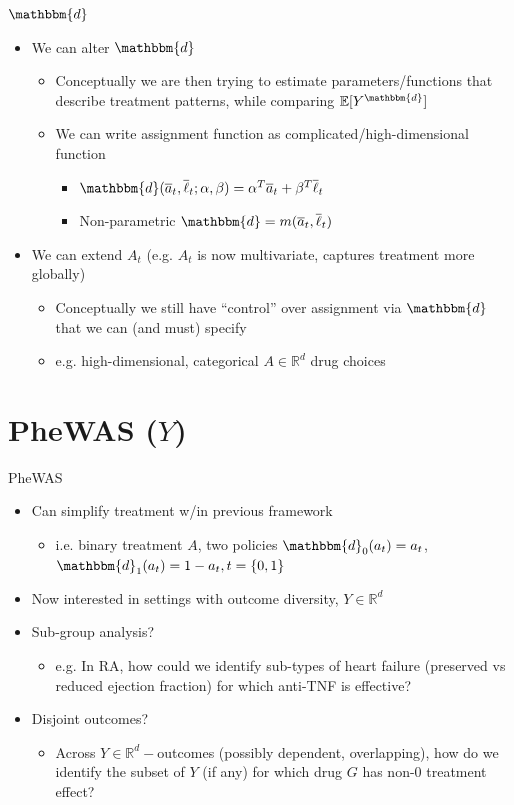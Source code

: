 \documentclass{beamer}
\newcommand{\EE}{\mathbb{E}}
\newcommand{\abar}{\overline{a}}
\newcommand{\lbar}{\overline{\ell}}
\newcommand{\subitem}[1]{\begin{itemize} \item #1 \end{itemize}}
\newcommand{\widesubitem}[2]{\begin{itemize} \item #1 \end{itemize} \vspace{#2}}
\newcommand{\RR}{\mathbb{R}}
\newcommand{\assign}{\mathbbm{d}}
\begin{document}
\begin{frame}{$\assign$}
    \begin{itemize}\setlength\itemsep{1em}
        \item We can alter $\assign$ 
        \subitem{Conceptually we are then trying to estimate parameters/functions that describe treatment patterns, while comparing $\EE[Y^\assign]$}
        \subitem{We can write assignment function as complicated/high-dimensional function 
        \widesubitem{$\assign(\abar_t, \lbar_t; \alpha, \beta) = \alpha^T\abar_t + \beta^T\lbar_t$}{0.5em}
        \widesubitem{Non-parametric $\assign = m(\abar_t, \lbar_t)$}{0.5em}
        }

        \item We can extend $A_t$ (e.g. $A_t$ is now multivariate, captures treatment more globally)
            \widesubitem{Conceptually we still have ``control'' over assignment via $\assign$ that we can (and must) specify}{0.5em}
            \widesubitem{e.g. high-dimensional, categorical $A\in\RR^d$ drug choices}{0.5em}

    \end{itemize}
\end{frame}



\section{PheWAS ($Y$)}

\begin{frame}{PheWAS}
    \begin{itemize}\setlength\itemsep{1em}
        \item Can simplify treatment w/in previous framework
        \subitem{i.e. binary treatment $A$, two policies $\assign_0(a_t) = a_t$, $\assign_1(a_t) = 1-a_t, t=\{0, 1\}$}
        \item Now interested in settings with outcome diversity, $Y \in \RR^d$
        \item Sub-group analysis? 
            \subitem{e.g. In RA, how could we identify sub-types of heart failure (preserved vs reduced ejection fraction) for which anti-TNF is effective?}

        \item Disjoint outcomes? 
        \subitem{Across $Y\in\RR^d-$outcomes (possibly dependent, overlapping), how do we identify the subset of $Y$ (if any) for which drug $G$ has non-0 treatment effect?}
    \end{itemize}
\end{frame}
\end{document}
